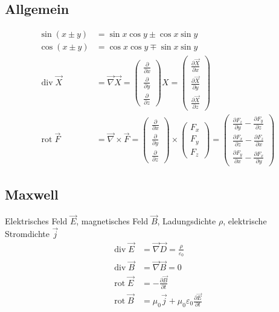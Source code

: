 \documentclass[landscape,8pt]{scrartcl}
\begin{document}
\begin{multicols}{3}
\subsection{Allgemein}
\begin{align*}
\sin(x\pm y) &= \sin x \cos y \pm \cos x \sin y	\\
\cos(x\pm y) &= \cos x \cos y \mp \sin x \sin y \\
\operatorname{div} \vec X &= \vec \nabla \vec X 
= \begin{pmatrix}\frac{\partial}{\partial x}\\\frac{\partial}{\partial y}\\\frac{\partial}{\partial z}\end{pmatrix}X 
=\begin{pmatrix}\frac{\partial \vec X}{\partial x}\\\frac{\partial \vec X}{\partial y}\\\frac{\partial \vec X}{\partial z}\end{pmatrix} \\
\operatorname{rot}\vec F &= \vec\nabla\times \vec F =\begin{pmatrix}  \frac{\partial}{\partial x} \\  \frac{\partial}{\partial y} \\  \frac{\partial}{\partial z}\end{pmatrix}\times\begin{pmatrix}  F_x\\  F_y\\  F_z\end{pmatrix}=\begin{pmatrix}  \frac{\partial F_z}{\partial y} - \frac{\partial F_y}{\partial z} \\  \frac{\partial F_x}{\partial z} - \frac{\partial F_z}{\partial x} \\  \frac{\partial F_y}{\partial x} - \frac{\partial F_x}{\partial y}\end{pmatrix}
\end{align*}

\subsection{Maxwell}
Elektrisches Feld $\vec E$, magnetisches Feld $\vec B$, Ladungsdichte $\rho$, elektrische Stromdichte $\vec j$
\begin{align*}
\operatorname{div} \vec E &= \vec \nabla \vec D = \frac \rho {\varepsilon_0} \\
\operatorname{div} \vec B &= \vec \nabla \vec B = 0 \\
\operatorname{rot} \vec E &= -\frac{\partial \vec B}{\partial t} \\
\operatorname{rot} \vec B &= \mu_0 \vec j+ \mu_0 \varepsilon_0 \frac{\partial \vec E}{\partial t} \\
\end{align*}
 
 
 
\end{multicols}
\end{document}
